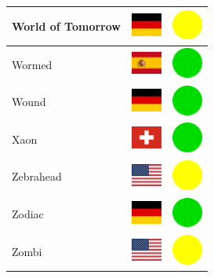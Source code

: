 \documentclass[12pt, a4paper, twoside]{report}
\begin{document}
\begin{center}
\begin{longtable}{|p{5cm}|p{2cm}|p{2cm}|}
			World of Tomorrow & \includegraphics[width=1cm]{4x3/de} & \includegraphics[width=1cm]{likes/m} \\ \hline
			Wormed & \includegraphics[width=1cm]{4x3/es} & \includegraphics[width=1cm]{likes/y} \\ \hline
			Wound & \includegraphics[width=1cm]{4x3/de} & \includegraphics[width=1cm]{likes/y} \\ \hline
			Xaon & \includegraphics[width=1cm]{4x3/ch} & \includegraphics[width=1cm]{likes/y} \\ \hline
			Zebrahead & \includegraphics[width=1cm]{4x3/us} & \includegraphics[width=1cm]{likes/m} \\ \hline
			Zodiac & \includegraphics[width=1cm]{4x3/de} & \includegraphics[width=1cm]{likes/y} \\ \hline
			Zombi & \includegraphics[width=1cm]{4x3/us} & \includegraphics[width=1cm]{likes/m} \\ \hline
			
		\end{longtable}
	\end{center}
\end{document}
